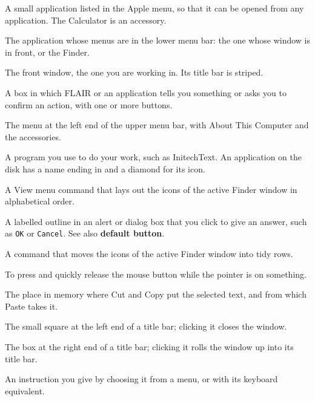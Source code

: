
A small application listed in the Apple menu, so
that it can be opened from any application.  The Calculator is an
accessory.

The application whose menus are in the
lower menu bar: the one whose window is in front, or the Finder.

The front window, the one you are working in.
Its title bar is striped.

A box in which FLAIR or an application tells you
something or asks you to confirm an action, with one or more buttons.

The menu at the left end of the upper menu bar,
with About This Computer and the accessories.

A program you use to do your work, such as
InitechText.  An application on the disk has a name ending in
 and a diamond for its icon.

A View menu command that lays out the
icons of the active Finder window in alphabetical order.

A labelled outline in an alert or dialog box that you
click to give an answer, such as \texttt{OK} or \texttt{Cancel}.  See also
\textbf{default button}.

A command that moves the icons of the active Finder
window into tidy rows.

To press and quickly release the mouse button while the
pointer is on something.

The place in memory where Cut and Copy put the
selected text, and from which Paste takes it.

The small square at the left end of a title bar;
clicking it closes the window.

The box at the right end of a title bar;
clicking it rolls the window up into its title bar.

An instruction you give by choosing it from a menu,
or with its keyboard equivalent.

